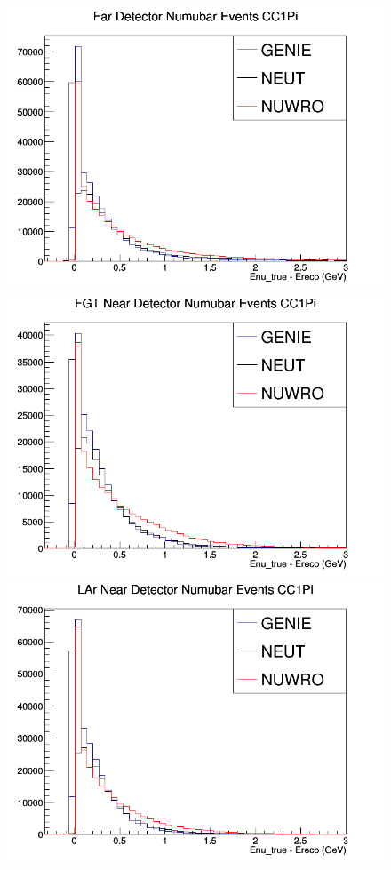 \begin{figure}[h]
\endminipage
\newline
{}
\includegraphics[width=\linewidth]{Ereco_Etrue/numubar_FD_CC1Pi.png}
\endminipage
{}
\includegraphics[width=\linewidth]{Ereco_Etrue/numubar_FGT_CC1Pi.png}
\endminipage
{}
\includegraphics[width=\linewidth]{Ereco_Etrue/numubar_LAr_CC1Pi.png}

\end{figure}
